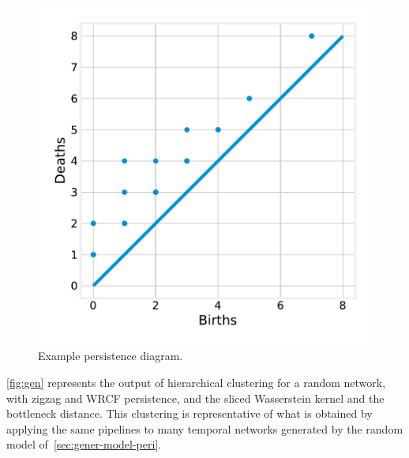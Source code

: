 \documentclass[a4paper,11pt,openany,extrafontsizes]{memoir}
\begin{document}
\begin{figure}[ht]
  \centering
  \includegraphics[width=.5\linewidth]{fig/diagram.pdf}
  \caption{Example persistence diagram.}%
  \label{fig:diagram}
\end{figure}

\autoref{fig:gen} represents the output of hierarchical clustering for
a random network, with zigzag and WRCF persistence, and the sliced
Wasserstein kernel and the bottleneck distance. This clustering is
representative of what is obtained by applying the same pipelines to
many temporal networks generated by the random model
of~\autoref{sec:gener-model-peri}.
 
\end{document}
